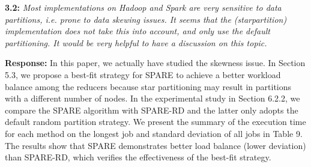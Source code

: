\documentclass{vldb}
\begin{document}
%
%
%


\textbf{3.2:} \emph{Most implementations
on Hadoop and Spark are very sensitive to data partitions, i.e. prone to data
skewing issues. It seems that the (starpartition)
implementation does not take
this into account, and only use the default partitioning. It would be very helpful
to have a discussion on this topic.}

\textbf{Response:} In this paper, we actually have studied the skewness issue. In Section 5.3, we propose a best-fit strategy for SPARE to achieve a better workload balance among the reducers because star partitioning may result in partitions with a different number of nodes. In the experimental study in Section 6.2.2, we compare the SPARE algorithm with SPARE-RD and the latter only adopts the default random partition strategy. We present the summary of the execution time for each method on the longest job and standard deviation of all jobs in Table 9. The results show that SPARE demonstrates better load balance (lower deviation)
than SPARE-RD, which verifies the effectiveness of the best-fit strategy. 
\end{document}

